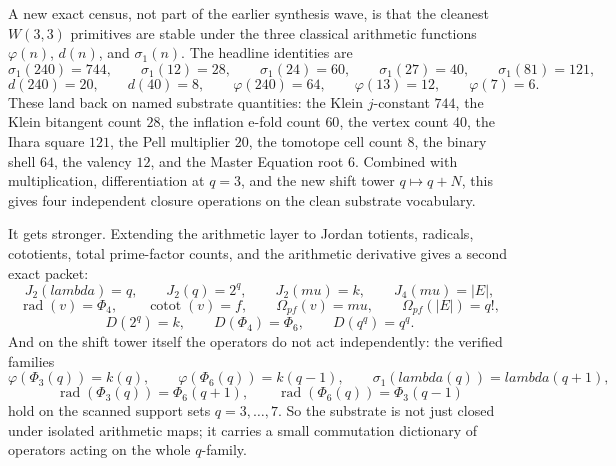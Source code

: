 \documentclass[11pt]{article}
\def\mathrm#1{#1}%
\def\lambda{lambda}%
\def\mu{mu}%
\def\Phi#1{Phi#1}%
\begin{document}
A new exact census, not part of the earlier synthesis wave, is that the cleanest $W(3,3)$ primitives are stable under the three classical arithmetic functions $\varphi(n)$, $d(n)$, and $\sigma_1(n)$. The headline identities are
\[
\sigma_1(240) = 744, \qquad \sigma_1(12) = 28, \qquad \sigma_1(24) = 60, \qquad \sigma_1(27) = 40, \qquad \sigma_1(81) = 121,
\]
\[
d(240) = 20, \qquad d(40) = 8, \qquad \varphi(240) = 64, \qquad \varphi(13) = 12, \qquad \varphi(7) = 6.
\]
These land back on named substrate quantities: the Klein $j$-constant $744$, the Klein bitangent count $28$, the inflation e-fold count $60$, the vertex count $40$, the Ihara square $121$, the Pell multiplier $20$, the tomotope cell count $8$, the binary shell $64$, the valency $12$, and the Master Equation root $6$. Combined with multiplication, differentiation at $q=3$, and the new shift tower $q \mapsto q+N$, this gives four independent closure operations on the clean substrate vocabulary.

It gets stronger. Extending the arithmetic layer to Jordan totients, radicals, cototients, total prime-factor counts, and the arithmetic derivative gives a second exact packet:
\[
J_2(\lambda)=q, \qquad J_2(q)=2^q, \qquad J_2(\mu)=k, \qquad J_4(\mu)=|E|,
\]
\[
\operatorname{rad}(v)=\Phi_4, \qquad \operatorname{cotot}(v)=f, \qquad \Omega_{\mathrm{pf}}(v)=\mu, \qquad \Omega_{\mathrm{pf}}(|E|)=q!,
\]
\[
D(2^q)=k, \qquad D(\Phi_4)=\Phi_6, \qquad D(q^q)=q^q.
\]
And on the shift tower itself the operators do not act independently: the verified families
\[
\varphi(\Phi_3(q)) = k(q), \qquad \varphi(\Phi_6(q)) = k(q-1), \qquad \sigma_1(\lambda(q)) = \lambda(q+1),
\]
\[
\operatorname{rad}(\Phi_3(q)) = \Phi_6(q+1), \qquad \operatorname{rad}(\Phi_6(q)) = \Phi_3(q-1)
\]
hold on the scanned support sets $q=3,\dots,7$. So the substrate is not just closed under isolated arithmetic maps; it carries a small commutation dictionary of operators acting on the whole $q$-family.
\end{document}
